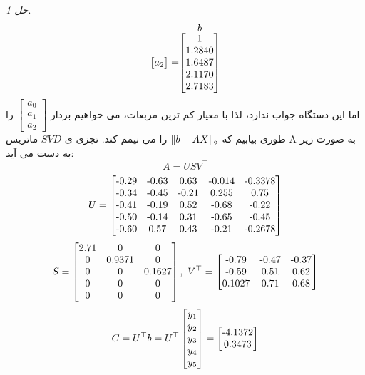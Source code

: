 \documentclass{article}
\theoremstyle{remark}		%
\newtheorem*{varsol}{حل}
\begin{document}
\begin{varsol}
\begin{equation}
{\begin{bmatrix}
		a_2 
	\end{bmatrix}
} = 
	\stackrel{\mbox{$b$}}{%
	\begin{bmatrix}
		1 \\
		$1.2840$ \\
		$1.6487$ \\
		$2.1170$ \\
		$2.7183$
	\end{bmatrix}
}
\end{equation}
اما این دستگاه جواب ندارد، لذا با معیار کم ترین مربعات، می خواهیم بردار $
\begin{bmatrix}
	a_0 \\ 
	a_1 \\ 
	a_2
\end{bmatrix}$
را طوری بیابیم که $\norm{b-AX}_2$ را می نیمم کند. تجزی ی $SVD$ ماتریس A به صورت زیر به دست می آید: \\
\[
A = USV^\top
\]
\[
U = 
\begin{bmatrix}
	$-0.29$ & $-0.63$ & $0.63$ & $-0.014$ & $-0.3378$ \\ 
	$-0.34$ & $-0.45$ & $-0.21$ & $0.255$ & $0.75$ \\ 
	$-0.41$ & $-0.19$ & $0.52$ & $-0.68$ & $-0.22$ \\ 
	$-0.50$ & $-0.14$ & $0.31$ & $-0.65$ & $-0.45$ \\ 
	$-0.60$ & $0.57$ & $0.43$ & $-0.21$ & $-0.2678$ 
\end{bmatrix}
\]
\[
S = 
\begin{bmatrix}
	$2.71$ & 0 & 0 \\
	0 & $0.9371$ & 0 \\
	0 & 0 & $0.1627$ \\
	0 & 0 & 0 \\
	0 & 0 & 0
\end{bmatrix} , \  V^\top = 
\begin{bmatrix}
	$-0.79$ & $-0.47$ & $-0.37$ \\  
	$-0.59$ & $0.51$ & $0.62$ \\  
	$0.1027$ & $0.71$ & $0.68$ 
\end{bmatrix}
\]
\[
C = U^\top b =  U^\top 
\begin{bmatrix}
	y_1 \\
	y_2 \\
	y_3 \\
	y_4 \\
	y_5
\end{bmatrix} = 
\begin{bmatrix}
	$-4.1372$ \\
	$0.3473$ \\ 

\end{bmatrix}\]
\end{varsol}
\end{document}
